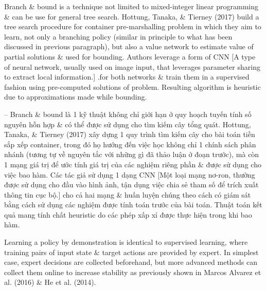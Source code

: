 \documentclass{article}
\begin{document}
\begin{itemize}
\begin{itemize}
\begin{itemize}
            Branch \& bound is a technique not limited to mixed-integer linear programming \& can be use for general tree search. Hottung, Tanaka, \& Tierney (2017) build a tree search procedure for container pre-marshalling problem in which they aim to learn, not only a branching policy (similar in principle to what has been discussed in previous paragraph), but also a value network to estimate value of partial solutions \& used for bounding. Authors leverage a form of CNN [A type of neural network, usually used on image input, that leverages parameter sharing to extract local information.] .for both networks \& train them in a supervised fashion using pre-computed solutions of problem. Resulting algorithm is heuristic due to approximations made while bounding.

            -- Branch \& bound là 1 kỹ thuật không chỉ giới hạn ở quy hoạch tuyến tính số nguyên hỗn hợp \& có thể được sử dụng cho tìm kiếm cây tổng quát. Hottung, Tanaka, \& Tierney (2017) xây dựng 1 quy trình tìm kiếm cây cho bài toán tiền sắp xếp container, trong đó họ hướng đến việc học không chỉ 1 chính sách phân nhánh (tương tự về nguyên tắc với những gì đã thảo luận ở đoạn trước), mà còn 1 mạng giá trị để ước tính giá trị của các nghiệm riêng phần \& được sử dụng cho việc bao hàm. Các tác giả sử dụng 1 dạng CNN [Một loại mạng nơ-ron, thường được sử dụng cho đầu vào hình ảnh, tận dụng việc chia sẻ tham số để trích xuất thông tin cục bộ.] cho cả hai mạng \& huấn luyện chúng theo cách có giám sát bằng cách sử dụng các nghiệm được tính toán trước của bài toán. Thuật toán kết quả mang tính chất heuristic do các phép xấp xỉ được thực hiện trong khi bao hàm.

            Learning a policy by demonstration is identical to supervised learning, where training pairs of input state \& target actions are provided by expert. In simplest case, expert decisions are collected beforehand, but more advanced methods can collect them online to increase stability as previously shown in Marcos Alvarez et al. (2016) \& He et al. (2014).


\end{itemize}
\end{itemize}
\end{itemize}
\end{document}
